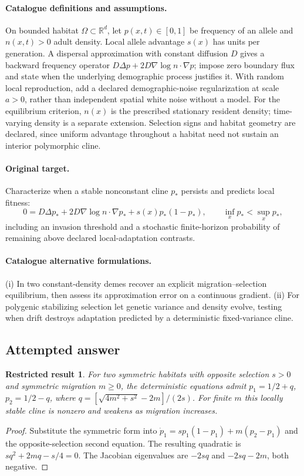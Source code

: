 \documentclass[11pt]{article}
\newcommand{\R}{\mathbb R}
\providecommand{\R}{\mathbb R}
\newtheorem{attemptresult}{Restricted result}[section]
\begin{document}
\paragraph{Catalogue definitions and assumptions.}
On bounded habitat $\Omega\subset\R^d$, let $p(x,t)\in[0,1]$ be frequency of an allele and $n(x,t)>0$ adult density. Local allele advantage $s(x)$ has units per generation. A dispersal approximation with constant diffusion $D$ gives a backward frequency operator $D\Delta p+2D\nabla\log n\cdot\nabla p$; impose zero boundary flux and state when the underlying demographic process justifies it. With random local reproduction, add a declared demographic-noise regularization at scale $a>0$, rather than independent spatial white noise without a model. For the equilibrium criterion, $n(x)$ is the prescribed stationary resident density; time-varying density is a separate extension. Selection signs and habitat geometry are declared, since uniform advantage throughout a habitat need not sustain an interior polymorphic cline.
\paragraph{Original target.}
Characterize when a stable nonconstant cline $p_*$ persists and predicts local fitness:
\[
 0=D\Delta p_*+2D\nabla\log n\cdot\nabla p_*
       +s(x)p_*(1-p_*),\qquad
 \inf_x p_*<\sup_x p_*,
\]
including an invasion threshold and a stochastic finite-horizon probability of remaining above declared local-adaptation contrasts.
\paragraph{Catalogue alternative formulations.}
(i) In two constant-density demes recover an explicit migration--selection equilibrium, then assess its approximation error on a continuous gradient. (ii) For polygenic stabilizing selection let genetic variance and density evolve, testing when drift destroys adaptation predicted by a deterministic fixed-variance cline.
\subsection{Attempted answer}
\begin{attemptresult}
For two symmetric habitats with opposite selection $s>0$ and symmetric migration $m\geq0$, the deterministic equations admit $p_1=1/2+q$, $p_2=1/2-q$, where $q=[\sqrt{4m^2+s^2}-2m]/(2s)$. For finite $m$ this locally stable cline is nonzero and weakens as migration increases.
\end{attemptresult}
\begin{proof}
Substitute the symmetric form into $\dot p_1=sp_1(1-p_1)+m(p_2-p_1)$ and the opposite-selection second equation. The resulting quadratic is $sq^2+2mq-s/4=0$. The Jacobian eigenvalues are $-2sq$ and $-2sq-2m$, both negative.
\end{proof}
\end{document}

